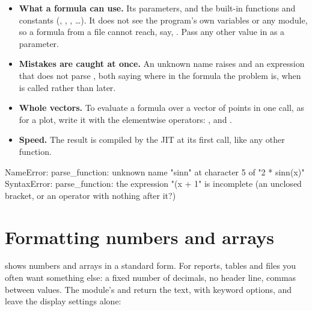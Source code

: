 \documentclass[11pt,a4paper,openany]{report}
\begin{document}
{{\begin{itemize}
\item \textbf{What a formula can use.} Its parameters, and the built-in
  functions and constants (, , , \ldots). It does
  not see the program's own variables or any module, so a formula from a file
  cannot reach, say, . Pass any other value in as a
  parameter.
\item \textbf{Mistakes are caught at once.} An unknown name raises
   and an expression that does not parse ,
  both saying where in the formula the problem is, when
   is called rather than later.
\item \textbf{Whole vectors.} To evaluate a formula over a vector of points in
  one call, as for a plot, write it with the elementwise operators: ,
   and .
\item \textbf{Speed.} The result is compiled by the JIT at its first call,
  like any other function.
\end{itemize}

\begin{axonout}
NameError: parse_function: unknown name "sinn" at character 5 of "2 * sinn(x)"
SyntaxError: parse_function: the expression "(x + 1" is incomplete (an unclosed bracket, or an operator with nothing after it?)
\end{axonout}


\section{Formatting numbers and arrays}\label{sec:fmt}

 shows numbers and arrays in a standard form. For reports,
tables and files you often want something else: a fixed number of decimals,
no header line, commas between values. The  module's
 and  return the text, with keyword options, and
leave the display settings alone:

}}
\end{document}
